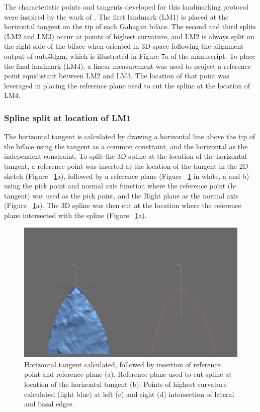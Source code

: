 \documentclass[review]{elsarticle}
\begin{document}
The characteristic points and tangents developed for this landmarking protocol were inspired by the work of \citet{RN11786}. The first landmark (LM1) is placed at the horizontal tangent on the tip of each Gahagan biface. The second and third splits (LM2 and LM3) occur at points of highest curvature, and LM2 is always split on the right side of the biface when oriented in 3D space following the alignment output of auto3dgm, which is illustrated in Figure 7a of the manuscript. To place the final landmark (LM4), a linear measurement was used to project a reference point equidistant between LM2 and LM3. The location of that point was leveraged in placing the reference plane used to cut the spline at the location of LM4.

\subsubsection*{Spline split at location of LM1}

The horizontal tangent is calculated by drawing a horizontal line above the tip of the biface using the tangent as a common constraint, and the horizontal as the independent constraint. To split the 3D spline at the location of the horizontal tangent, a reference point was inserted at the location of the tangent in the 2D sketch (Figure ~\ref{fig:figLM1}a), followed by a reference plane (Figure ~\ref{fig:figLM1} in white, a and b) using the pick point and normal axis function where the reference point (h-tangent) was used as the pick point, and the Right plane as the normal axis (Figure ~\ref{fig:figLM1}a). The 3D spline was then cut at the location where the reference plane intersected with the spline (Figure ~\ref{fig:figLM1}a).

\begin{figure}[h!]\centering
\includegraphics[width=\linewidth]{analysis/images/lm1.pdf}
\caption{Horizontal tangent calculated, followed by insertion of reference point and reference plane (a). Reference plane used to cut spline at location of the horizontal tangent (b). Points of highest curvature calculated (light blue) at left (c) and right (d) intersection of lateral and basal edges.}
\label{fig:figLM1}
\end{figure}
\end{document}
